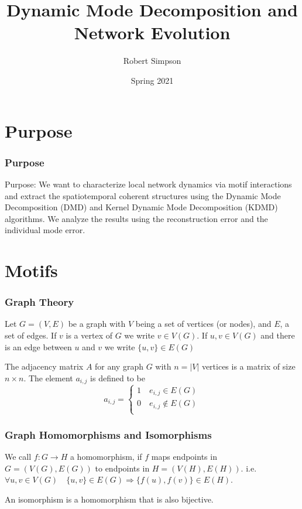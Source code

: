 \documentclass{beamer}
\title[DMD and Network Evolution]{Dynamic Mode Decomposition and Network Evolution}
\author{Robert Simpson}
\institute{San Diego State University}
\date{Spring 2021}
\begin{document}
\frame{\titlepage}

\begin{frame}
\tableofcontents
\end{frame}

\section{Purpose}
\begin{frame}
    \frametitle{Purpose}
    Purpose: We want to characterize local network dynamics via motif interactions and extract
    the spatiotemporal coherent structures using
    the Dynamic Mode Decomposition (DMD) and Kernel Dynamic Mode Decomposition (KDMD) algorithms.
    We analyze the results using the reconstruction error and the individual mode error.
    \end{frame}
\section{Motifs}


\begin{frame}
    \frametitle{Graph Theory}
    \begin{definition}[Graph]
        Let $G = (V,E)$ be a graph with $V$ being a set of vertices (or nodes), 
        and $E$, a set of edges. If $v$ is a vertex of $G$ we write $v \in V(G)$. 
        If $u,v \in V(G)$ and there is an edge between $u$ and $v$ we 
        write $\{u,v\} \in E(G)$
    \end{definition}
    

    \begin{definition}
        The adjacency matrix $A$ for any graph $G$ with $n=|V|$ vertices is a matrix of size
        $n \times n$. The element $a_{i,j}$ is defined to be
        $$
        a_{i,j} = 
        \begin{cases}
            1 \quad e_{i,j} \in E(G)\\
            0 \quad e_{i,j} \not \in E(G)\\
        \end{cases}
        $$
        \label{def:adjmat}
    \end{definition}
\end{frame}


\begin{frame}
\frametitle{Graph Homomorphisms and Isomorphisms}

 \begin{definition}[Homomorphism]
            We call $f: G \rightarrow H$ a homomorphism,
            if $f$ maps endpoints in $G=(V(G),E(G))$ to endpoints in $H=(V(H),E(H))$.
            i.e. $ \forall u,v \in V(G) \quad \{u,v\} \in E(G) \Rightarrow \{f(u),
            f(v)\} \in E(H)$.
 \end{definition}

\begin{definition}[Isomorphism]
    An isomorphism is a homomorphism that is also bijective.
\end{definition}

\end{frame}
\end{document}
